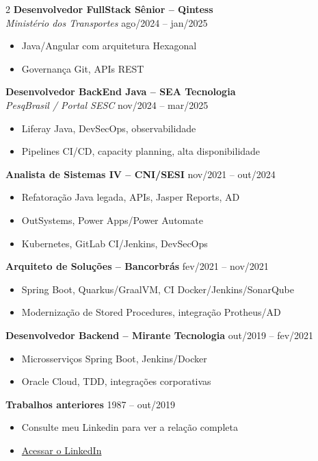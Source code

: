 \documentclass[a4paper,11pt]{article}
\begin{document}
\begin{paracol}{2}
\textbf{Desenvolvedor FullStack Sênior – Qintess} \\
\textit{Ministério dos Transportes}
\hfill ago/2024 – jan/2025
\begin{itemize}
    \item Java/Angular com arquitetura Hexagonal
    \item Governança Git, APIs REST
\end{itemize}

\textbf{Desenvolvedor BackEnd Java – SEA Tecnologia} \\
\textit{PesqBrasil / Portal SESC}
\hfill nov/2024 – mar/2025
\begin{itemize}
    \item Liferay Java, DevSecOps, observabilidade
    \item Pipelines CI/CD, capacity planning, alta disponibilidade
\end{itemize}

\textbf{Analista de Sistemas IV – CNI/SESI} \hfill nov/2021 – out/2024
\begin{itemize}
    \item Refatoração Java legada, APIs, Jasper Reports, AD
    \item OutSystems, Power Apps/Power Automate
    \item Kubernetes, GitLab CI/Jenkins, DevSecOps
\end{itemize}

\textbf{Arquiteto de Soluções – Bancorbrás} \hfill fev/2021 – nov/2021
\begin{itemize}
    \item Spring Boot, Quarkus/GraalVM, CI Docker/Jenkins/SonarQube
    \item Modernização de Stored Procedures, integração Protheus/AD
\end{itemize}

\textbf{Desenvolvedor Backend – Mirante Tecnologia} \hfill out/2019 – fev/2021
\begin{itemize}
    \item Microsserviços Spring Boot, Jenkins/Docker
    \item Oracle Cloud, TDD, integrações corporativas
\end{itemize}

\textbf{Trabalhos anteriores} \hfill 1987 – out/2019
\begin{itemize}
	\item Consulte meu Linkedin para ver a relação completa
	\item  \href{https://www.linkedin.com/in/fernando-anselmo-bb423623/}{Acessar o LinkedIn}
\end{itemize}

\end{paracol}
\end{document}
